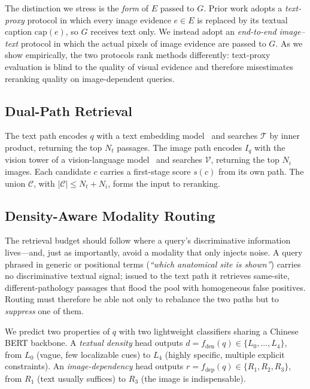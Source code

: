 The distinction we stress is the \emph{form} of $E$ passed to $G$. Prior work
adopts a \emph{text-proxy} protocol in which every image evidence $e\in E$ is
replaced by its textual caption $\text{cap}(e)$, so $G$ receives text only.
We instead adopt an \emph{end-to-end image--text} protocol in which the actual
pixels of image evidence are passed to $G$. As we show empirically, the two
protocols rank methods differently: text-proxy evaluation is blind to the
quality of visual evidence and therefore misestimates reranking quality on
image-dependent queries.

\subsection{Dual-Path Retrieval}
\label{sec:retrieval}

The text path encodes $q$ with a text embedding model~\cite{chen2024bgem3} and
searches $\mathcal{T}$ by inner product, returning the top $N_t$ passages. The
image path encodes $I_q$ with the vision tower of a vision-language
model~\cite{bai2023qwenvl} and searches $\mathcal{V}$, returning the top $N_i$
images. Each candidate $c$ carries a first-stage score $s(c)$ from its own path.
The union $\mathcal{C}$, with $|\mathcal{C}|\le N_t+N_i$, forms the input to
reranking.

\subsection{Density-Aware Modality Routing}
\label{sec:routing}

The retrieval budget should follow where a query's discriminative information
lives---and, just as importantly, avoid a modality that only injects noise. A
query phrased in generic or positional terms (\emph{``which anatomical site is
shown''}) carries no discriminative textual signal; issued to the text path it
retrieves same-site, different-pathology passages that flood the pool with
homogeneous false positives. Routing must therefore be able not only to
rebalance the two paths but to \emph{suppress} one of them.

We predict two properties of $q$ with two lightweight classifiers sharing a
Chinese BERT backbone. A \emph{textual density} head outputs
$d=f_{\text{den}}(q)\in\{L_0,\dots,L_4\}$, from $L_0$ (vague, few localizable
cues) to $L_4$ (highly specific, multiple explicit constraints). An
\emph{image-dependency} head outputs $r=f_{\text{dep}}(q)\in\{R_1,R_2,R_3\}$,
from $R_1$ (text usually suffices) to $R_3$ (the image is indispensable).

